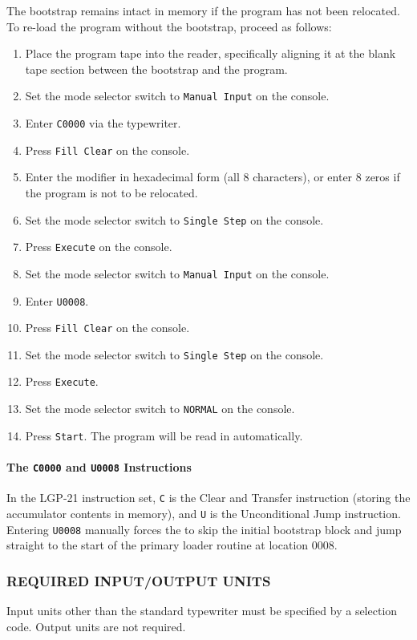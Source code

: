 The bootstrap remains intact in memory if the program has not been relocated. To re-load the program without the bootstrap, proceed as follows:
\begin{enumerate}[label=\alph*)]
\item Place the program tape into the reader, specifically aligning it at the blank tape section between the bootstrap and the program.
\item Set the mode selector switch to \texttt{Manual Input} on the console.
\item Enter \texttt{C0000} via the typewriter.
\item Press \texttt{Fill Clear} on the console.
\item Enter the modifier in hexadecimal form (all 8 characters), or enter 8 zeros if the program is not to be relocated.
\item Set the mode selector switch to \texttt{Single Step} on the console.
\item Press \texttt{Execute} on the console.
\item Set the mode selector switch to \texttt{Manual Input} on the console.
\item Enter \texttt{U0008}.
\item Press \texttt{Fill Clear} on the console.
\item Set the mode selector switch to \texttt{Single Step} on the console.
\item Press \texttt{Execute}.
\item Set the mode selector switch to \texttt{NORMAL} on the console.
\item Press \texttt{Start}. The program will be read in automatically.
\end{enumerate}

\paragraph{The \texttt{C0000} and \texttt{U0008} Instructions}
In the LGP-21 instruction set, \texttt{C} is the Clear and Transfer instruction (storing the accumulator contents in memory), and \texttt{U} is the Unconditional Jump instruction. Entering \texttt{U0008} manually forces the to skip the initial bootstrap block and jump straight to the start of the primary loader routine at location 0008.

\subsubsection*{REQUIRED INPUT/OUTPUT UNITS}
Input units other than the standard typewriter must be specified by a selection code. Output units are not required.

